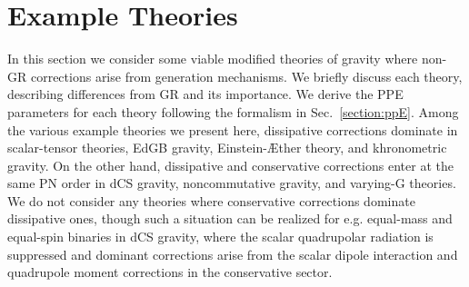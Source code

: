 \documentclass[prd,twocolumn,nofootinbib]{revtex4-1}
\begin{document}
 \section{Example Theories}\label{section:Example}
In this section we consider some viable modified theories of gravity where non-GR corrections arise from generation mechanisms. We briefly discuss each theory, describing differences from GR and its importance. We derive the PPE parameters for each theory following the formalism in Sec.~\ref{section:ppE}. Among the various example theories we present here, dissipative corrections dominate in scalar-tensor theories, EdGB gravity, Einstein-\AE ther theory, and khronometric gravity. On the other hand, dissipative and conservative corrections enter at the same PN order in dCS gravity, noncommutative gravity, and varying-G theories. We do not consider any theories where conservative corrections dominate dissipative ones, though such a situation can be realized for e.g. equal-mass and equal-spin binaries in dCS gravity, where the scalar quadrupolar radiation is suppressed and dominant corrections arise from the scalar dipole interaction and quadrupole moment corrections in the conservative sector.
\end{document}
